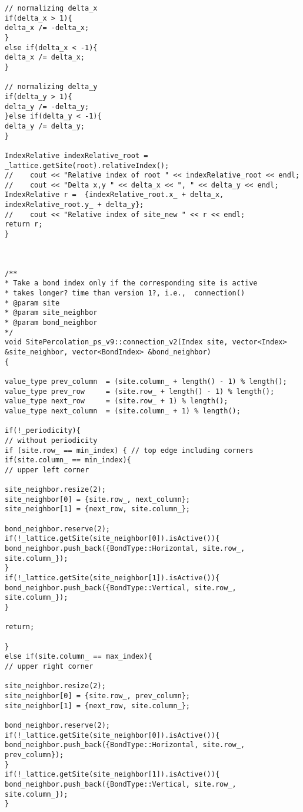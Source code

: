 \begin{lstlisting}[style=CStyle]
// normalizing delta_x
if(delta_x > 1){
delta_x /= -delta_x;
}
else if(delta_x < -1){
delta_x /= delta_x;
}

// normalizing delta_y
if(delta_y > 1){
delta_y /= -delta_y;
}else if(delta_y < -1){
delta_y /= delta_y;
}

IndexRelative indexRelative_root = _lattice.getSite(root).relativeIndex();
//    cout << "Relative index of root " << indexRelative_root << endl;
//    cout << "Delta x,y " << delta_x << ", " << delta_y << endl;
IndexRelative r =  {indexRelative_root.x_ + delta_x, indexRelative_root.y_ + delta_y};
//    cout << "Relative index of site_new " << r << endl;
return r;
}



/**
* Take a bond index only if the corresponding site is active
* takes longer? time than version 1?, i.e.,  connection()
* @param site
* @param site_neighbor
* @param bond_neighbor
*/
void SitePercolation_ps_v9::connection_v2(Index site, vector<Index> &site_neighbor, vector<BondIndex> &bond_neighbor)
{

value_type prev_column  = (site.column_ + length() - 1) % length();
value_type prev_row     = (site.row_ + length() - 1) % length();
value_type next_row     = (site.row_ + 1) % length();
value_type next_column  = (site.column_ + 1) % length();

if(!_periodicity){
// without periodicity
if (site.row_ == min_index) { // top edge including corners
if(site.column_ == min_index){
// upper left corner

site_neighbor.resize(2);
site_neighbor[0] = {site.row_, next_column};
site_neighbor[1] = {next_row, site.column_};

bond_neighbor.reserve(2);
if(!_lattice.getSite(site_neighbor[0]).isActive()){
bond_neighbor.push_back({BondType::Horizontal, site.row_, site.column_});
}
if(!_lattice.getSite(site_neighbor[1]).isActive()){
bond_neighbor.push_back({BondType::Vertical, site.row_, site.column_});
}

return;

}
else if(site.column_ == max_index){
// upper right corner

site_neighbor.resize(2);
site_neighbor[0] = {site.row_, prev_column};
site_neighbor[1] = {next_row, site.column_};

bond_neighbor.reserve(2);
if(!_lattice.getSite(site_neighbor[0]).isActive()){
bond_neighbor.push_back({BondType::Horizontal, site.row_, prev_column});
}
if(!_lattice.getSite(site_neighbor[1]).isActive()){
bond_neighbor.push_back({BondType::Vertical, site.row_, site.column_});
}


\end{lstlisting}
